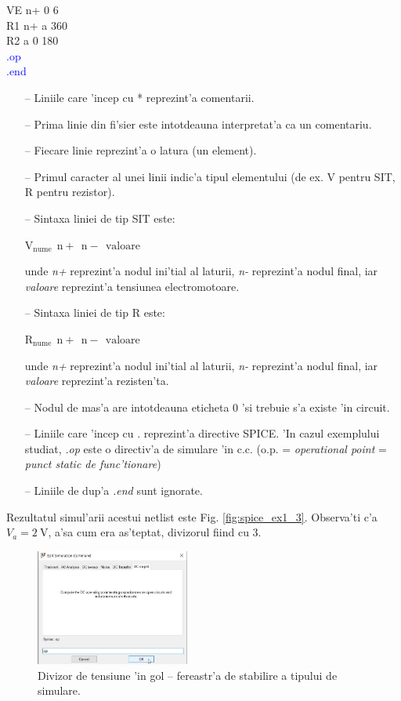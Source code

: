 \begin{enumerate}
VE n+ 0 6 \\
R1 n+ a 360 \\
R2 a  0 180 \\
\textcolor{blue}{.op} \\
\textcolor{blue}{.end} 

\begin{itemize}
\item[--] Liniile care 'incep cu * reprezint'a comentarii.
\item[--] Prima linie din fi'sier este intotdeauna interpretat'a ca un comentariu.
\item[--] Fiecare linie reprezint'a o latura (un element).
\item[--] Primul caracter al unei linii indic'a tipul elementului (de ex. V pentru SIT, R pentru rezistor).
\item[--] Sintaxa liniei de tip SIT este:

$\mathrm{V_{nume}~~n+~~n-~~valoare}$

unde \textit{n+} reprezint'a nodul ini'tial al laturii, \textit{n-} reprezint'a nodul final, iar \textit{valoare} reprezint'a tensiunea electromotoare.
\item[--] Sintaxa liniei de tip R este:

$\mathrm{R_{nume}~~n+~~n-~~valoare}$

unde \textit{n+} reprezint'a nodul ini'tial al laturii, \textit{n-} reprezint'a nodul final, iar \textit{valoare} reprezint'a rezisten'ta. 
\item[--] Nodul de mas'a are intotdeauna eticheta 0 'si trebuie s'a existe 'in circuit.
\item[--] Liniile care 'incep cu . reprezint'a directive SPICE. 'In cazul exemplului studiat, \textit{.op} este o directiv'a de simulare 'in c.c. (o.p. = \textit{operational point} = \textit{punct static de func'tionare})
\item[--] Liniile de dup'a \textit{.end} sunt ignorate.

\end{itemize}
\end{enumerate}

Rezultatul simul'arii acestui netlist este Fig. \ref{fig:spice_ex1_3}. Observa'ti c'a $V_a = 2~\mathrm{V}$, a'sa cum era as'teptat, divizorul fiind cu 3.

\begin{figure}
	\centering
		\includegraphics[width=0.45\textwidth]{laborator_01/figuri/spice_divizor_comanda_simulare}
	\caption{Divizor de tensiune 'in gol -- fereastr'a de stabilire a tipului de simulare.}
	\label{fig:spice_ex1_5}
\end{figure}


